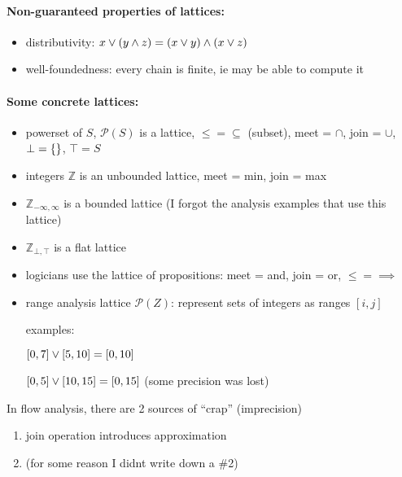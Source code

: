 \documentclass{article}
\begin{document}
\paragraph{Non-guaranteed properties of lattices:}
\begin{itemize}
  \item distributivity: $x\vee (y\wedge z) = (x\vee y)\wedge (x\vee z)$
  \item well-foundedness: every chain is finite, ie may be able to compute it
\end{itemize}

\paragraph{Some concrete lattices:}
\begin{itemize}
  \item powerset of $S$, $\mathcal{P}(S)$ is a lattice, $\leq = \subseteq$
    (subset), meet = $\cap$, join = $\cup$, $\bot = \{\}$, $\top = S$
  \item integers $\mathbb{Z}$ is an unbounded lattice, meet = min, join = max
  \item $\mathbb{Z}_{-\infty,\infty}$ is a bounded lattice (I forgot the
    analysis examples that use this lattice)
  \item $\mathbb{Z}_{\bot,\top}$ is a flat lattice
  \item logicians use the lattice of propositions: meet = and, join = or, $\leq
    = \implies$
  \item range analysis lattice $\mathcal{P}(Z)$: represent sets of integers as
    ranges $[i,j]$

    examples: 

    $[0,7]\vee [5,10] = [0,10]$

    $[0,5]\vee [10,15] = [0,15]$ (some precision was lost)
\end{itemize}

In flow analysis, there are 2 sources of ``crap'' (imprecision)
\begin{enumerate}
  \item join operation introduces approximation
  \item (for some reason I didnt write down a \#2)
\end{enumerate}
\end{document}
